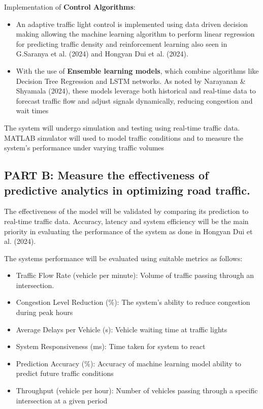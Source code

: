 \documentclass[12pt,a4paper]{article}
\begin{document}
Implementation of \textbf{Control Algorithms}: 

\begin{itemize}
    \item An adaptive traffic light control is implemented using data driven decision making allowing the machine learning algorithm to perform linear regression for predicting traffic density and reinforcement learning also seen in G.Saranya et al. (2024) and Hongyan Dui et al. (2024). 

    \item With the use of \textbf{Ensemble learning models}, which combine algorithms like Decision Tree Regression and LSTM networks. As noted by Narayanan \& Shyamala (2024), these models leverage both historical and real-time data to forecast traffic flow and adjust signals dynamically, reducing congestion and wait times 
\end{itemize}

The system will undergo simulation and testing using real-time traffic data. MATLAB simulator will used to model traffic conditions and to measure the system's performance under varying traffic volumes 

\subsection{PART B: Measure the effectiveness of predictive analytics in optimizing road traffic.}



 The effectiveness of the model will be validated by comparing its prediction to real-time traffic data. Accuracy, latency and system efficiency will be the main priority in evaluating the performance of the system as done in Hongyan Dui et al. (2024). 

The systems performance will be evaluated using suitable metrics as follows:

\begin{itemize}
    \item Traffic Flow Rate (vehicle per minute): Volume of traffic passing through an intersection. 

    \item Congestion Level Reduction (\%): The system’s ability to reduce congestion during peak hours 

    \item Average Delays per Vehicle (s): Vehicle waiting time at traffic lights 

    \item System Responsiveness (ms): Time taken for system to react 

    \item Prediction Accuracy (\%): Accuracy of machine learning model ability to predict future traffic conditions 

    \item Throughput (vehicle per hour): Number of vehicles passing through a specific intersection at a given period 
\end{itemize}
\end{document}
